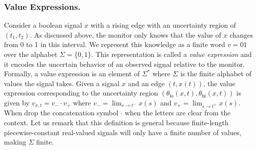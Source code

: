 \subsubsection{Value Expressions.}
Consider a boolean signal $x$ with a rising edge with an uncertainty region of $(t_1, t_2)$.
As discussed above, the monitor only knows that the value of $x$ changes from 0 to 1 in this interval.
We represent this knowledge as a finite word $v = 01$ over the alphabet $\Sigma = \{0,1\}$.
This representation is called a \emph{value expression} and it encodes the uncertain behavior of an observed signal relative to the monitor.
Formally, a value expression is an element of $\Sigma^*$ where $\Sigma$ is the finite alphabet of values the signal takes.
Given a signal $x$ and an edge $(t, x(t))$, the value expression corresponding to the uncertainty region $(\theta_{\text{lo}}(x,t), \theta_{\text{hi}}(x,t))$ is given by $v_{x,t} = v_- \cdot v_+$ where $v_- = \lim_{s \to t^-} x(s)$ and $v_+ = \lim_{s \to t^+} x(s)$.
When drop the concatenation symbol $\cdot$ when the letters are clear from the context.
Let us remark that this definition is general because finite-length piecewise-constant real-valued signals will only have a finite number of values, making $\Sigma$ finite.

